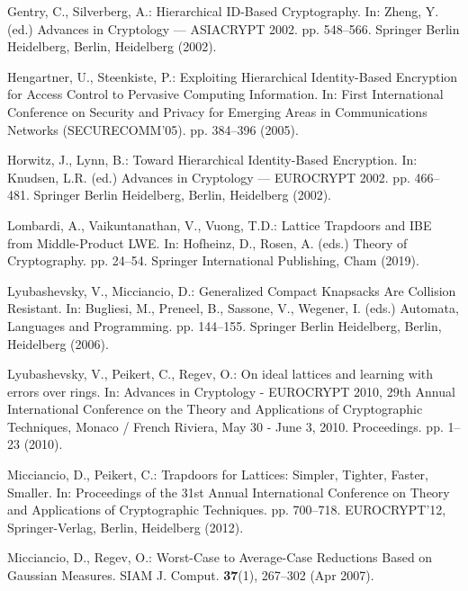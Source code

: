 \documentclass[runningheads]{llncs}
\begin{document}
\begin{thebibliography}{10}
	Gentry, C., Silverberg, A.: {Hierarchical ID-Based Cryptography}. In: Zheng, Y.
	(ed.) Advances in Cryptology --- ASIACRYPT 2002. pp. 548--566. Springer
	Berlin Heidelberg, Berlin, Heidelberg (2002). 
	
	{Hengartner}, U., {Steenkiste}, P.: {Exploiting Hierarchical Identity-Based
		Encryption for Access Control to Pervasive Computing Information}. In: First
	International Conference on Security and Privacy for Emerging Areas in
	Communications Networks (SECURECOMM'05). pp. 384--396 (2005).
	
	Horwitz, J., Lynn, B.: {Toward Hierarchical Identity-Based Encryption}. In:
	Knudsen, L.R. (ed.) Advances in Cryptology --- EUROCRYPT 2002. pp. 466--481.
	Springer Berlin Heidelberg, Berlin, Heidelberg (2002).
	
	Lombardi, A., Vaikuntanathan, V., Vuong, T.D.: {Lattice Trapdoors and IBE from
		Middle-Product LWE}. In: Hofheinz, D., Rosen, A. (eds.) Theory of
	Cryptography. pp. 24--54. Springer International Publishing, Cham (2019).
	
	Lyubashevsky, V., Micciancio, D.: {Generalized Compact Knapsacks Are Collision
		Resistant}. In: Bugliesi, M., Preneel, B., Sassone, V., Wegener, I. (eds.)
	Automata, Languages and Programming. pp. 144--155. Springer Berlin
	Heidelberg, Berlin, Heidelberg (2006). 
	
	Lyubashevsky, V., Peikert, C., Regev, O.: On ideal lattices and learning with
	errors over rings. In: Advances in Cryptology - {EUROCRYPT} 2010, 29th Annual
	International Conference on the Theory and Applications of Cryptographic
	Techniques, Monaco / French Riviera, May 30 - June 3, 2010. Proceedings. pp.
	1--23 (2010). 
	
	Micciancio, D., Peikert, C.: {Trapdoors for Lattices: Simpler, Tighter, Faster,
		Smaller}. In: Proceedings of the 31st Annual International Conference on
	Theory and Applications of Cryptographic Techniques. pp. 700--718.
	EUROCRYPT'12, Springer-Verlag, Berlin, Heidelberg (2012).
	
	Micciancio, D., Regev, O.: {Worst-Case to Average-Case Reductions Based on
		Gaussian Measures}. SIAM J. Comput.  \textbf{37}(1),  267--302 (Apr 2007).
	

\end{thebibliography}
\end{document}

